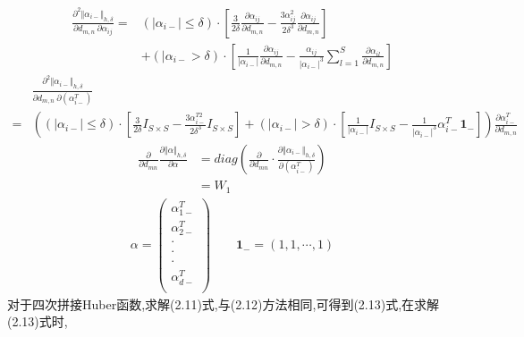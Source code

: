 \documentclass[245.0pt]{article}
\begin{document}
\begin{equation*}
\begin{split}
\frac{\partial^{2} \Vert \alpha_{i-} \Vert_{h, \delta } } {\partial d_{m,n} \ \partial \alpha_{ij} } = & ( | \alpha_{i-} | \leq \delta ) \cdot \left [ \frac{3}{2 \delta} \frac{\partial \alpha_{ij} }{\partial d_{m,n} } - \frac{3 \alpha^{2}_{ij} }{2 \delta^{3} } \frac{\partial \alpha_{ij} }{\partial d_{m,n}} \right ] \\
&+ ( |\alpha_{i-} > \delta ) \cdot \left [ \frac{1}{|\alpha_{i-} |} \frac{\partial \alpha_{ij} }{\partial d_{m,n} } - \frac{\alpha_{ij} }{ |\alpha_{i-} |^{3} } \sum_{l = 1}^{S} \frac{\partial \alpha_{il} }{\partial d_{m,n}} \right ]
\end{split} \tag{3.15}
\end{equation*}
\begin{equation*}
\begin{split}
&\frac{\partial^{2} \Vert \alpha_{i-} \Vert_{h, \delta } } {\partial d_{m,n} \ \partial ( \alpha_{i-}^{T} ) } \\
=& \left (  ( | \alpha_{i-} | \leq \delta ) \cdot \left [ \frac{3}{2 \delta} I_{S\times S} - \frac{3 \alpha^{T2}_{i-} }{2 \delta^{3} } I_{S\times S} \right ] + ( |\alpha_{i-} | > \delta ) \cdot \left [ \frac{1}{|\alpha_{i-} |} I_{S\times S}  - \frac{1}{ |\alpha_{i-} |^{3} } \alpha_{i-}^{T} \boldsymbol{1_{-}} \right ] \right ) \frac{\partial \alpha_{i-}^{T}}{\partial d_{m,n} }
\end{split} \tag{3.16}
\end{equation*}
\begin{align*}
\frac{\partial}{\partial d_{mn}} \frac{\partial \Vert \alpha \Vert_{h,\delta}}{\partial \alpha} &= diag \left(\frac{\partial}{\partial d_{mn}} \cdot \frac{\partial\Vert\alpha_{i-}\Vert_{h,\delta}}{\partial (\alpha_{i-}^T)} \right)\\
&= W_1 \tag{3.17}
\end{align*}
%
\begin{gather*}
\alpha = 
\begin{pmatrix}
\alpha_{1-}^T\\
\alpha_{2-}^T\\
\cdot\\
\cdot\\
\cdot\\
\alpha_{d-}^T\\
\end{pmatrix}
\qquad \boldsymbol{1_{-}} = (1,1,\cdots,1) 
\end{gather*}
%
对于四次拼接Huber函数,求解(2.11)式,与(2.12)方法相同,可得到(2.13)式,在求解(2.13)式时,
\end{document}
